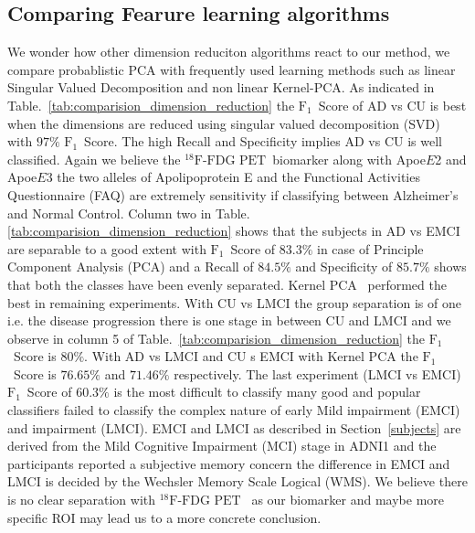 \documentclass[authoryear,preprint,revi	ew,12pt]{elsarticle}
\newcommand{\acc}[1]     {$ #1 \% $}
\newcommand{\Alzheimers} {{Alzheimer\textquoteright s} }
\newcommand{\F}   {$ \textrm{F}_1 $}
\newcommand{\FDGPET}   {$ ^{18}\textrm{F-FDG PET} $}
\newcommand{\apoe}[1]   {Apoe$ E $#1}
\begin{document}
\subsection{Comparing Fearure learning algorithms}
\label{subsection:dim_red}
We wonder how other dimension reduciton algorithms react to our method, we compare probablistic PCA with frequently used learning methods such as linear Singular Valued Decomposition and non linear Kernel-PCA.
As indicated in Table.~\ref{tab:comparision_dimension_reduction} the \F~Score of AD vs CU is best when the dimensions are reduced using singular valued decomposition (SVD) with \acc{97} \F~Score. The high Recall and Specificity implies AD vs CU is well classified. Again we believe the \FDGPET~biomarker along with \apoe{2} and \apoe{3} the two alleles of Apolipoprotein E and the Functional Activities Questionnaire (FAQ) are extremely sensitivity if classifying between \Alzheimers and Normal Control. 
Column two in Table.\ref{tab:comparision_dimension_reduction} shows that the subjects in AD vs EMCI are separable to a good extent with \F~Score of \acc{83.3} in case of Principle Component Analysis (PCA) and a Recall of \acc{84.5} and Specificity of \acc{85.7} shows that both the classes have been evenly separated. 
Kernel PCA~\citep{mika1998kernel} performed the best in remaining experiments. With CU vs LMCI the group separation is of one i.e. the disease progression there is one stage in between CU and LMCI and we observe in column 5 of Table.~\ref{tab:comparision_dimension_reduction} the \F~Score is \acc{80}. With AD vs LMCI and CU s EMCI with Kernel PCA the \F~Score is \acc{76.65} and \acc{71.46} respectively. The last experiment (LMCI vs EMCI) \F~Score of \acc{60.3} is the most difficult to classify many good and popular classifiers failed to classify the complex nature of early Mild impairment (EMCI) and impairment (LMCI). EMCI and LMCI as described in Section~\ref{subjects} are derived from the Mild Cognitive Impairment (MCI) stage in ADNI1 and the participants reported a subjective memory concern the difference in EMCI and LMCI is decided by the Wechsler Memory Scale Logical (WMS). We believe there is no clear separation with \FDGPET~ as our biomarker and maybe more specific ROI may lead us to a more concrete conclusion. 
\end{document}
